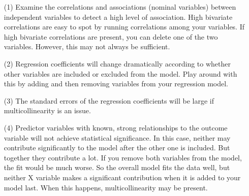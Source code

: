 \documentclass[a4paper,12pt]{article}
\begin{document}
\begin{itemize}
\item [(1)] Examine the correlations and associations (nominal variables) between independent variables to detect a high level of association. High bivariate correlations are easy to spot by running correlations among your variables. If high bivariate correlations are present, you can delete one of the two variables. However, this may not always be sufficient.

\item [(2)] Regression coefficients will change dramatically according to whether other variables are included or excluded from the model. Play around with this by adding and then removing variables from your regression model.

\item [(3)] The standard errors of the regression coefficients will be large if multicollinearity is an issue.

\item [(4)] Predictor variables with known, strong relationships to the outcome variable will not achieve statistical significance. In this case, neither may contribute significantly to the model after the other one is included. But together they contribute a lot. If you remove both variables from the model, the fit would be much worse. So the overall model fits the data well, but neither X variable makes a significant contribution when it is added to your model last. When this happens, multicollinearity may be present.

\end{itemize}
\end{document}
